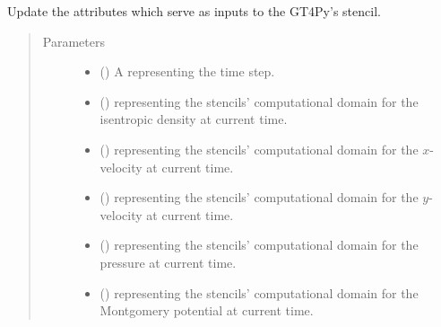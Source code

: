 \documentclass[letterpaper,10pt,english]{sphinxmanual}
\begin{document}
\begin{fulllineitems}
\begin{fulllineitems}
\label{\detokenize{api:dycore.prognostic_isentropic.PrognosticIsentropicTL2._set_inputs}}
Update the attributes which serve as inputs to the GT4Py’s stencil.
\begin{quote}\begin{description}
\item[{Parameters}] \leavevmode\begin{itemize}
\item {} 
 () \textendash{} A  representing the time step.

\item {} 
 () \textendash{}  representing the stencils’ computational domain for the isentropic density
at current time.

\item {} 
 () \textendash{}  representing the stencils’ computational domain for the \(x\)-velocity
at current time.

\item {} 
 () \textendash{}  representing the stencils’ computational domain for the \(y\)-velocity
at current time.

\item {} 
 () \textendash{}  representing the stencils’ computational domain for the pressure at current time.

\item {} 
 () \textendash{}  representing the stencils’ computational domain for the Montgomery potential
at current time.


\end{itemize}
\end{description}
\end{quote}
\end{fulllineitems}
\end{fulllineitems}
\end{document}
